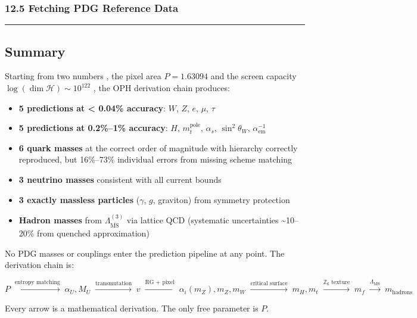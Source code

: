 \subsubsection{12.5 Fetching PDG Reference Data}\label{125-fetching-pdg-reference-data}

\begin{Shaded}
\begin{Highlighting}[]
\end{Highlighting}
\end{Shaded}

\begin{center}\rule{0.5\linewidth}{0.5pt}\end{center}

\subsection{Summary}\label{summary}

Starting from two numbers , the pixel area \(P = 1.63094\) and the screen capacity \(\log(\dim\mathcal{H}) \sim 10^{122}\) , the OPH derivation chain produces:

\begin{itemize}
\tightlist
\item
  \textbf{5 predictions at \textless{} 0.04\% accuracy}: \(W\), \(Z\), \(e\), \(\mu\), \(\tau\)
\item
  \textbf{5 predictions at 0.2\%--1\% accuracy}: \(H\), \(m_t^{\text{pole}}\), \(\alpha_s\), \(\sin^2\theta_W\), \(\alpha_{\text{em}}^{-1}\)
\item
  \textbf{6 quark masses} at the correct order of magnitude with hierarchy correctly reproduced, but 16\%--73\% individual errors from missing scheme matching
\item
  \textbf{3 neutrino masses} consistent with all current bounds
\item
  \textbf{3 exactly massless particles} (\(\gamma\), \(g\), graviton) from symmetry protection
\item
  \textbf{Hadron masses} from \(\Lambda_{\overline{\text{MS}}}^{(3)}\) via lattice QCD (systematic uncertainties \textasciitilde10--20\% from quenched approximation)
\end{itemize}

No PDG masses or couplings enter the prediction pipeline at any point. The derivation chain is:

\[\boxed{P \;\xrightarrow{\text{entropy matching}}\; \alpha_U, M_U \;\xrightarrow{\text{transmutation}}\; v \;\xrightarrow{\text{RG + pixel}}\; \alpha_i(m_Z), m_Z, m_W \;\xrightarrow{\text{critical surface}}\; m_H, m_t \;\xrightarrow{\mathbb{Z}_6\text{ texture}}\; m_f \;\xrightarrow{\Lambda_{\overline{\text{MS}}}}\; m_{\text{hadrons}}}\]

Every arrow is a mathematical derivation. The only free parameter is \(P\).

